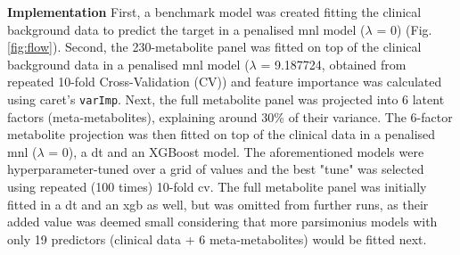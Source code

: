 \documentclass{amsart}
\begin{document}

\leavevmode\newline \textbf{Implementation}\hspace{.25cm} First, a benchmark model was created fitting the clinical background data to predict the target in a penalised \acrshort{mnl} model ($\lambda$ = 0) (Fig. \ref{fig:flow}). Second, the 230-metabolite panel was fitted on top of the clinical background data in a penalised \acrshort{mnl} model ($\lambda$ = 9.187724, obtained from repeated 10-fold Cross-Validation (CV)) and feature importance was calculated using \textsf{caret}'s \texttt{varImp}. Next, the full metabolite panel was projected into 6 latent factors (meta-metabolites), explaining around 30\% of their variance. The 6-factor metabolite projection was then fitted on top of the clinical data in a penalised \acrshort{mnl} ($\lambda$ = 0), a \acrlong{dt} and an XGBoost model. The aforementioned models were hyperparameter-tuned over a grid of values and the best "tune" was selected using repeated (100 times) 10-fold \acrshort{cv}. The full metabolite panel was initially fitted in a \acrshort{dt} and an \acrshort{xgb} as well, but was omitted from further runs, as their added value was deemed small considering that more parsimonius models with only 19 predictors (clinical data + 6 meta-metabolites) would be fitted next.
\end{document}
